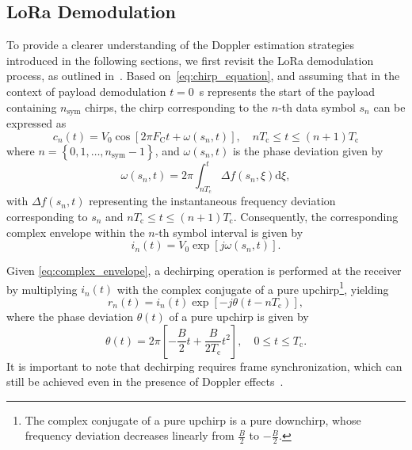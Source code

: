 \documentclass{IEEEtran}
\begin{document}
\subsection{LoRa Demodulation}
\label{Sec:LoRa_demodulation}
To provide a clearer understanding of the Doppler estimation strategies introduced in the following sections, we first revisit the \ac{LoRa} demodulation process, as outlined in~\cite{Pasolini.2022}. Based on~\eqref{eq:chirp_equation}, and assuming that in the context of payload demodulation $t=0$~s represents the start of the payload containing $n_{\text{sym}}$ chirps, the chirp corresponding to the $n$-th data symbol $s_n$ can be expressed as
\begin{equation}
    c_n(t) = V_0 \cos\left[2 \pi F_\mathrm{C} t + \omega(s_n,t)\right], \quad n T_\text{c} \leq t \leq (n+1) T_\text{c}
\end{equation}
where $n = \left\{0, 1, \dots, n_{\text{sym}} -1 \right\}$, and $\omega(s_n,t)$ is the phase deviation given by
\begin{equation}
    \omega(s_n, t) = 2 \pi \int_{nT_\text{c}}^{t} \Delta f(s_n, \xi) \mathrm{d} \xi,
\end{equation}
with $\Delta f(s_n, t)$ representing the instantaneous frequency deviation corresponding to $s_n$ and $nT_\text{c}\leq t \leq (n+1)T_\text{c}$. Consequently, the corresponding complex envelope within the $n$-th  symbol interval is given by
\begin{equation}
    i_n(t) = V_0 \exp\left[j \omega(s_n,t)\right].
    \label{eq:complex_envelope}
\end{equation}  

Given \eqref{eq:complex_envelope}, a dechirping operation is performed at the receiver by multiplying $i_n(t)$ with the complex conjugate of a pure upchirp\footnote{The complex conjugate of a pure upchirp is a pure downchirp, whose frequency deviation decreases linearly from $\frac{B}{2}$ to $-\frac{B}{2}$.},  yielding 
\begin{equation}
    r_n(t) = i_n(t) \exp\left[-j \theta(t - n T_\text{c})\right],
    \label{eq:dechirped_signal}
\end{equation}  
where the phase deviation $\theta(t)$ of a pure upchirp is given by
\begin{equation}
    \theta(t) = 2 \pi \left[-\frac{B}{2} t + \frac{B}{2 T_\text{c}} t^2 \right], \quad 0 \leq t \leq T_\text{c}.
\end{equation}
It is important to note that dechirping requires frame synchronization, which can still be achieved even in the presence of Doppler effects~\cite{Colavolpe.2019}. 
\end{document}
